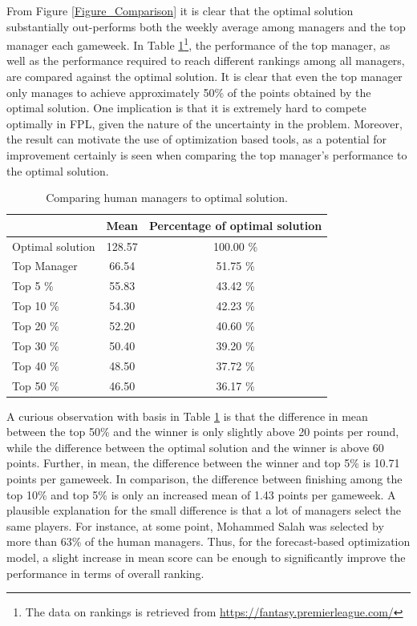  
From Figure \ref{Figure_Comparison} it is clear that the optimal solution substantially out-performs both the weekly average among managers and the top manager each gameweek. In Table \ref{Optimal_Human}\footnote{The data on rankings is retrieved from \url{https://fantasy.premierleague.com/}}, the performance of the top manager, as well as the performance required to reach different rankings among all managers, are compared against the optimal solution. It is clear that even the top manager only manages to achieve approximately 50\% of the points obtained by the optimal solution. One implication is that it is extremely hard to compete optimally in FPL, given the nature of the uncertainty in the problem. Moreover, the result can motivate the use of optimization based tools, as a potential for improvement certainly is seen when comparing the top manager's performance to the optimal solution.

\begin{table}[H]
\centering
\begin{tabular}{lcc}
\hline
                 & Mean   & \multicolumn{1}{l}{Percentage of optimal solution} \\
\hline                 
Optimal solution & 128.57 & 100.00 \%                                          \\
Top Manager           & 66.54  & 51.75 \%                                           \\
Top 5 \%         & 55.83  & 43.42 \%                                           \\
Top 10 \%        & 54.30  & 42.23 \%                                           \\
Top 20 \%        & 52.20  & 40.60 \%                                           \\
Top 30 \%        & 50.40  & 39.20 \%                                           \\
Top 40 \%        & 48.50  & 37.72 \%                                           \\
Top 50 \%        & 46.50  & 36.17 \%                                           \\
\hline
\end{tabular}
\caption{Comparing human managers to optimal solution.}
\label{Optimal_Human}
\end{table}

A curious observation with basis in Table \ref{Optimal_Human} is that the difference in mean between the top 50\% and the winner is only slightly above 20 points per round, while the difference between the optimal solution and the winner is above 60 points. Further, in mean, the difference between the winner and top 5\% is 10.71 points per gameweek. In comparison, the difference between finishing among the top 10\% and top 5\% is only an increased mean of 1.43 points per gameweek. A plausible explanation for the small difference is that a lot of managers select the same players. For instance, at some point, Mohammed Salah was selected by more than 63\% of the human managers. Thus, for the forecast-based optimization model, a slight increase in mean score can be enough to significantly improve the performance in terms of overall ranking. 



